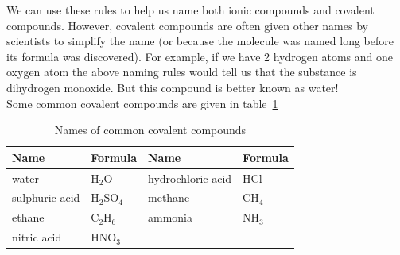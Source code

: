 \label{m38708*eip-163}We can use these rules to help us name both ionic compounds and covalent compounds. However, covalent compounds are often given other names by scientists to simplify the name (or because the molecule was named long before its formula was discovered). For example, if we have 2 hydrogen atoms and one oxygen atom the above naming rules would tell us that the substance is dihydrogen monoxide. But this compound is better known as water!\\
Some common covalent compounds are given in table~\ref{tab:covalentcpds}
\begin{table}[H]
 \begin{center}
  \begin{tabular}{|l|l|l|l|} \hline
   \textbf{Name} & \textbf{Formula} & \textbf{Name} & \textbf{Formula} \\ \hline
water & $\text{H}_{2}\text{O}$ & hydrochloric acid & $\text{HCl}$ \\ \hline 
sulphuric acid & $\text{H}_{2}\text{SO}_{4}$ & methane & $\text{CH}_{4}$  \\ \hline
ethane & $\text{C}_{2}\text{H}_6$ & ammonia  & $\text{NH}_{3}$ \\ \hline
nitric acid & $\text{HNO}_{3}$ & & \\ \hline 
  \end{tabular}
\caption{Names of common covalent compounds}
 \end{center}
\label{tab:covalentcpds}
\end{table}
 

